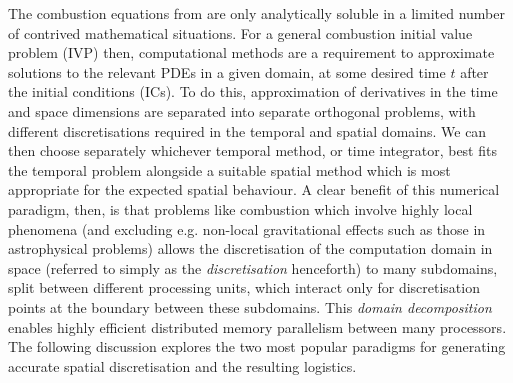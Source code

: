 The combustion equations from  are only analytically soluble in a limited number of contrived mathematical situations. For a general combustion initial value problem (IVP) then, computational methods are a requirement to approximate solutions to the relevant PDEs in a given domain, at some desired time $t$ after the initial conditions (ICs). To do this, approximation of derivatives in the time and space dimensions are separated into separate orthogonal problems, with different discretisations required in the temporal and spatial domains. We can then choose separately whichever temporal method, or time integrator, best fits the temporal problem alongside a suitable spatial method which is most appropriate for the expected spatial behaviour. A clear benefit of this numerical paradigm, then, is that problems like combustion which involve highly local phenomena (and excluding e.g. non-local gravitational effects such as those in astrophysical problems) allows the discretisation of the computation domain in space (referred to simply as the \emph{discretisation} henceforth) to many subdomains, split between different processing units, which interact only for discretisation points at the boundary between these subdomains. This \emph{domain decomposition} enables highly efficient distributed memory parallelism between many processors. The following discussion explores the two most popular paradigms for generating accurate spatial discretisation and the resulting logistics.

